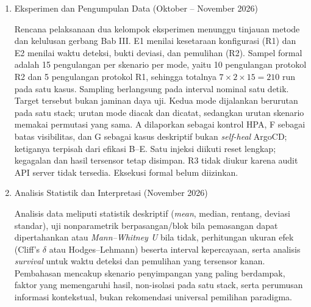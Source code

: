 \begin{enumerate}
    Sebelum eksperimen dimulai, fase kalibrasi dilakukan untuk memastikan validitas internal. Kegiatan meliputi: (a)~\textit{deployment} beban uji (\textit{workload}) komposit multi-service pada satu stack dan verifikasi kedua mode secara berurutan; (b)~pembekuan revisi sumber, SHA-256 hasil render, image digest, dan versi runtime; (c)~verifikasi \textit{baseline} bersih dan reset; (d)~verifikasi kepemilikan HPA serta prosedur penjedaan/pemulihan ArgoCD; (e)~verifikasi penggunaan sumber daya \textit{node} di bawah 70\%; dan (f)~uji coba protokol kolektor dengan sampling satu detik serta skrip otomasi. Pilot terbatas bukan data formal.
    
    \item Eksperimen dan Pengumpulan Data (Oktober -- November 2026)
    
    Rencana pelaksanaan dua kelompok eksperimen menunggu tinjauan metode dan kelulusan gerbang Bab III. E1 menilai kesetaraan konfigurasi (R1) dan E2 menilai waktu deteksi, bukti deviasi, dan pemulihan (R2). Sampel formal adalah 15 pengulangan per skenario per mode, yaitu 10 pengulangan protokol R2 dan 5 pengulangan protokol R1, sehingga totalnya $7 \times 2 \times 15 = 210$ run pada satu kasus. Sampling berlangsung pada interval nominal satu detik. Target tersebut bukan jaminan daya uji. Kedua mode dijalankan berurutan pada satu stack; urutan mode diacak dan dicatat, sedangkan urutan skenario memakai permutasi yang sama. A dilaporkan sebagai kontrol HPA, F sebagai batas visibilitas, dan G sebagai kasus deskriptif bukan \textit{self-heal} ArgoCD; ketiganya terpisah dari efikasi B--E. Satu injeksi diikuti reset lengkap; kegagalan dan hasil tersensor tetap disimpan. R3 tidak diukur karena audit API server tidak tersedia. Eksekusi formal belum diizinkan.
    
    \item Analisis Statistik dan Interpretasi (November 2026)
    
    Analisis data meliputi statistik deskriptif (\textit{mean}, median, rentang, deviasi standar), uji nonparametrik berpasangan/blok bila pemasangan dapat dipertahankan atau \textit{Mann--Whitney U} bila tidak, perhitungan ukuran efek (Cliff's $\delta$ atau Hodges--Lehmann) beserta interval kepercayaan, serta analisis \textit{survival} untuk waktu deteksi dan pemulihan yang tersensor kanan. Pembahasan mencakup skenario penyimpangan yang paling berdampak, faktor yang memengaruhi hasil, non-isolasi pada satu stack, serta perumusan informasi kontekstual, bukan rekomendasi universal pemilihan paradigma.
    

\end{enumerate}

